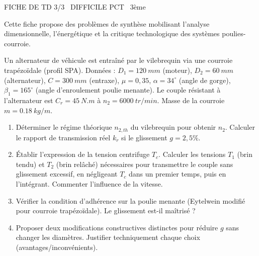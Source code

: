 \documentclass[11pt]{article}
\begin{document}
\begin{tcolorbox}[enhanced,colback=popink,colframe=popink,arc=10pt,boxrule=0pt,left=12pt,right=12pt,top=9pt,bottom=9pt]
{\color{white}\popxbold\small FICHE DE TD 3/3 \textbullet\ DIFFICILE \hfill PCT \textbullet\ 3ème\par}
\end{tcolorbox}
\vspace{4pt}
Cette fiche propose des problèmes de synthèse mobilisant l'analyse dimensionnelle, l'énergétique et la critique technologique des systèmes poulies-courroie.

\begin{exercice}
Un alternateur de véhicule est entraîné par le vilebrequin via une courroie trapézoïdale (profil SPA). Données : $D_1 = \SI{120}{mm}$ (moteur), $D_2 = \SI{60}{mm}$ (alternateur), $C = \SI{300}{mm}$ (entraxe), $\mu = 0,35$, $\alpha = 34^\circ$ (angle de gorge), $\beta_1 = 165^\circ$ (angle d'enroulement poulie menante). Le couple résistant à l'alternateur est $C_r = \SI{45}{N.m}$ à $n_2 = \SI{6000}{tr/min}$. Masse de la courroie $m = \SI{0,18}{kg/m}$.
\begin{enumerate}
    \item Déterminer le régime théorique $n_{2,th}$ du vilebrequin pour obtenir $n_2$. Calculer le rapport de transmission réel $k_r$ si le glissement $g = 2,5\%$.
    \item Établir l'expression de la tension centrifuge $T_c$. Calculer les tensions $T_1$ (brin tendu) et $T_2$ (brin relâché) nécessaires pour transmettre le couple sans glissement excessif, en négligeant $T_c$ dans un premier temps, puis en l'intégrant. Commenter l'influence de la vitesse.
    \item Vérifier la condition d'adhérence sur la poulie menante (Eytelwein modifié pour courroie trapézoïdale). Le glissement est-il maîtrisé ?
    \item Proposer deux modifications constructives distinctes pour réduire $g$ sans changer les diamètres. Justifier techniquement chaque choix (avantages/inconvénients).
\end{enumerate}
\end{exercice}
\end{document}
